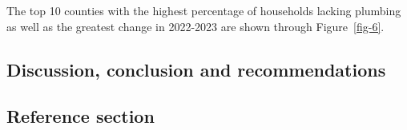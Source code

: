 \documentclass[
  letterpaper,
  DIV=11,
  numbers=noendperiod]{scrartcl}
\begin{document}
The top 10 counties with the highest percentage of households lacking
plumbing as well as the greatest change in 2022-2023 are shown through
Figure~\ref{fig-6}.

\hypertarget{discussion-conclusion-and-recommendations}{%
\subsection{Discussion, conclusion and
recommendations}\label{discussion-conclusion-and-recommendations}}

\hypertarget{reference-section}{%
\subsection{Reference section}\label{reference-section}}
\end{document}
